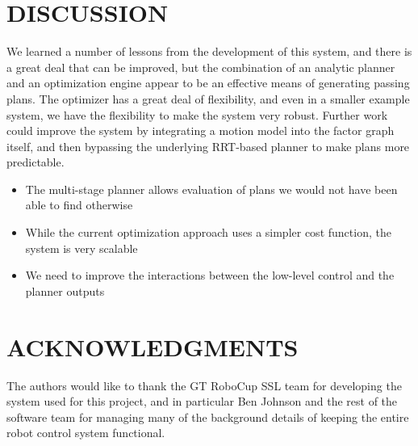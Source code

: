 \documentclass[a4paper, 10pt, conference]{ieeeconf}      %
\begin{document}
\section{DISCUSSION}
We learned a number of lessons from the development of this system, and there is a great deal that can be improved, but the combination of an analytic planner and an optimization engine appear to be an effective means of generating passing plans.  The optimizer has a great deal of flexibility, and even in a smaller example system, we have the flexibility to make the system very robust.  Further work could improve the system by integrating a motion model into the factor graph itself, and then bypassing the underlying RRT-based planner to make plans more predictable. 
\begin{itemize}
\item The multi-stage planner allows evaluation of plans we would not have been able to find otherwise
\item While the current optimization approach uses a simpler cost function, the system is very scalable
\item We need to improve the interactions between the low-level control and the planner outputs
\end{itemize}



\section{ACKNOWLEDGMENTS}

The authors would like to thank the GT RoboCup SSL team for developing the system used for this project, and in particular Ben Johnson and the rest of the software team for managing many of the background details of keeping the entire robot control system functional. 




\end{document}
